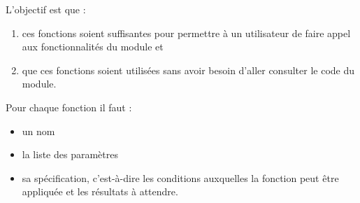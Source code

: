 \documentclass[a4paper,17pt]{extarticle}
\providecommand{\tightlist}{%
      \setlength{\itemsep}{0pt}\setlength{\parskip}{0pt}}
\begin{document}
L'objectif est que :

\begin{enumerate}
\def\labelenumi{\arabic{enumi}.}
\tightlist
\item
  ces fonctions soient suffisantes pour permettre à un utilisateur de
  faire appel aux fonctionnalités du module et
\item
  que ces fonctions soient utilisées sans avoir besoin d'aller consulter
  le code du module.
\end{enumerate}

Pour chaque fonction il faut :

\begin{itemize}
\tightlist
\item
  un nom
\item
  la liste des paramètres
\item
  sa spécification, c'est-à-dire les conditions auxquelles la fonction
  peut être appliquée et les résultats à attendre.
\end{itemize}
\end{document}
